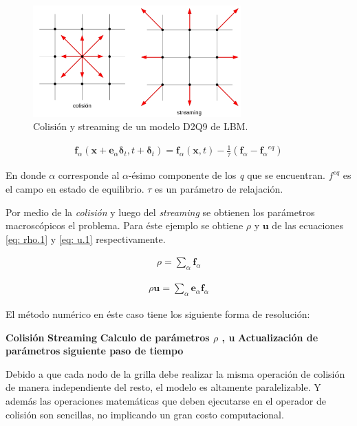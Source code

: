 \begin{figure}[h!]
	\centering
	\includegraphics[width=8cm]{grilla_stre_colli_intro.png}
	\caption{Colisión y streaming de un modelo D2Q9 de LBM.}
	\label{fig:grilla_D2Q9}
\end{figure}


\begin{align}
	\mathbf{f}_{\alpha} (\mathbf{x} + \mathbf{e}_{\alpha} \mathbf{\delta}_{t}, t + \mathbf{\delta}_{t})  = \mathbf{f}_{\alpha} (\mathbf{x}, t) - \frac{1}{\tau} (\mathbf{f}_{\alpha} - {\mathbf{f}_{\alpha}}^{eq})
	\label{eq:field_intro} 
\end{align}

En donde $\alpha$ corresponde al  $\alpha$-ésimo componente de los \textit{q} que se encuentran. $f^{eq}$ es el campo en estado de equilibrio. $\tau$ es un parámetro de relajación. 

Por medio de la \textit{colisión} y luego del \textit{streaming} se obtienen los parámetros macroscópicos el problema. Para éste ejemplo se obtiene $\rho$ y $\mathbf{u}$ de las ecuaciones \ref{eq: rho.1} y \ref{eq: u.1} respectivamente.

\begin{align}
	\rho = \sum_{\alpha} \mathbf{f}_{\alpha}
	\label{eq: rho.1}
\end{align}

\begin{align}
	\rho \mathbf{u}= \sum_{\alpha} \mathbf{e}_{\alpha} \mathbf{f}_{\alpha}
	\label{eq: u.1}
\end{align}

El método numérico en éste caso tiene los siguiente forma de resolución:

	 \textbf{Colisión}  \textbf{Streaming} \textbf{Calculo de parámetros $\rho$ , u} \textbf{Actualización de parámetros} \textbf{siguiente paso de tiempo} 

Debido a que cada nodo de la grilla debe realizar la misma operación de colisión de manera independiente del resto, el modelo es altamente paralelizable. Y además las operaciones matemáticas que deben ejecutarse en el operador de colisión son sencillas, no implicando un gran costo computacional.

